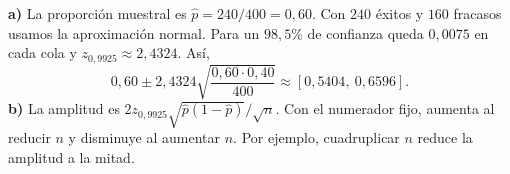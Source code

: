 \textbf{a)} La proporción muestral es $\hat p=240/400=0{,}60$. Con $240$ éxitos y $160$ fracasos usamos la aproximación normal. Para un $98{,}5\%$ de confianza queda $0{,}0075$ en cada cola y $z_{0{,}9925}\approx2{,}4324$. Así,
\[
0{,}60\pm2{,}4324\sqrt{\frac{0{,}60\cdot0{,}40}{400}}
\approx\boxed{[0{,}5404,\ 0{,}6596]}.
\]
\textbf{b)} La amplitud es $2z_{0{,}9925}\sqrt{\hat p(1-\hat p)}/\sqrt n$. Con el numerador fijo, aumenta al reducir $n$ y disminuye al aumentar $n$. Por ejemplo, cuadruplicar $n$ reduce la amplitud a la mitad.
